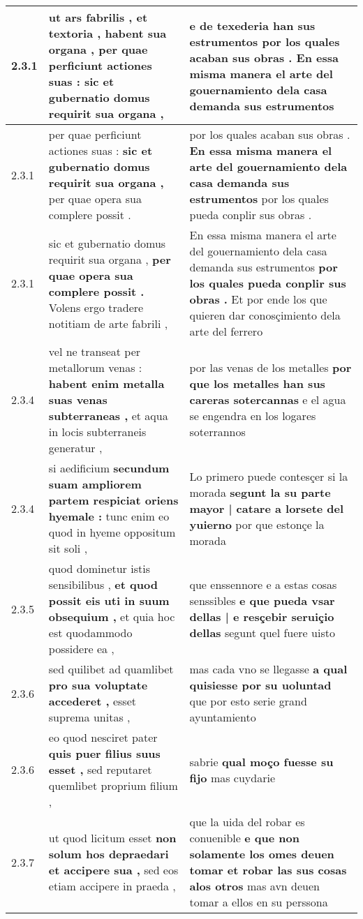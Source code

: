 \begin{tabular}{|p{1cm}|p{6.5cm}|p{6.5cm}|}
2.3.1 & ut ars fabrilis , et textoria , habent sua organa , \textbf{ per quae perficiunt actiones suas : } sic et gubernatio domus requirit sua organa , & e de texederia han sus estrumentos \textbf{ por los quales acaban sus obras . } En essa misma manera el arte del gouernamiento dela casa demanda sus estrumentos \\\hline
2.3.1 & per quae perficiunt actiones suas : \textbf{ sic et gubernatio domus requirit sua organa , } per quae opera sua complere possit . & por los quales acaban sus obras . \textbf{ En essa misma manera el arte del gouernamiento dela casa demanda sus estrumentos } por los quales pueda conplir sus obras . \\\hline
2.3.1 & sic et gubernatio domus requirit sua organa , \textbf{ per quae opera sua complere possit . } Volens ergo tradere notitiam de arte fabrili , & En essa misma manera el arte del gouernamiento dela casa demanda sus estrumentos \textbf{ por los quales pueda conplir sus obras . } Et por ende los que quieren dar conosçimiento dela arte del ferrero \\\hline
2.3.4 & vel ne transeat per metallorum venas : \textbf{ habent enim metalla suas venas subterraneas , } et aqua in locis subterraneis generatur , & por las venas de los metalles \textbf{ por que los metalles han sus careras sotercannas } e el agua se engendra en los logares soterrannos \\\hline
2.3.4 & si aedificium \textbf{ secundum suam ampliorem partem respiciat oriens hyemale : } tunc enim eo quod in hyeme oppositum sit soli , & Lo primero puede contesçer si la morada \textbf{ segunt la su parte mayor | catare a lorsete del yuierno } por que estonçe la morada \\\hline
2.3.5 & quod dominetur istis sensibilibus , \textbf{ et quod possit eis uti in suum obsequium , } et quia hoc est quodammodo possidere ea , & que enssennore e a estas cosas senssibles \textbf{ e que pueda vsar dellas | e resçebir seruiçio dellas } segunt quel fuere uisto \\\hline
2.3.6 & sed quilibet ad quamlibet \textbf{ pro sua voluptate accederet , } esset suprema unitas , & mas cada vno se llegasse \textbf{ a qual quisiesse por su uoluntad } que por esto serie grand ayuntamiento \\\hline
2.3.6 & eo quod nesciret pater \textbf{ quis puer filius suus esset , } sed reputaret quemlibet proprium filium , & sabrie \textbf{ qual moço fuesse su fijo } mas cuydarie \\\hline
2.3.7 & ut quod licitum esset \textbf{ non solum hos depraedari et accipere sua , } sed eos etiam accipere in praeda , & que la uida del robar es conuenible \textbf{ e que non solamente los omes deuen tomar et robar las sus cosas alos otros } mas avn deuen tomar a ellos en su perssona \\\hline

\end{tabular}
